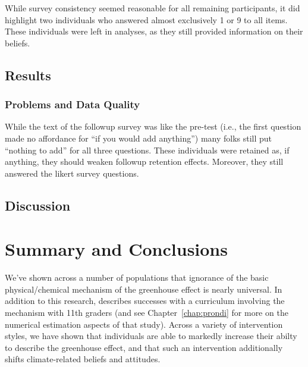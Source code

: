 While survey consistency seemed reasonable for all remaining participants, it
did highlight two individuals who answered almost exclusively 1 or 9 to all
items. These individuals were left in analyses, as they still provided
information on their beliefs. 


\subsection{Results}

\subsubsection{Problems and Data Quality}

While the text of the followup survey was like the pre-test (i.e., the first
question made no affordance for “if you would add anything”) many folks still put
“nothing to add” for all three questions. These individuals were retained as, if
anything, they should weaken followup retention effects. Moreover, they still
answered the likert survey questions. 

\subsection{Discussion}

\section{Summary and Conclusions}

We've shown across a number of populations that ignorance of the basic
physical/chemical mechanism of the greenhouse effect is nearly universal. In
addition to this research, \textcite{felipe_numerical_2012} describes successes
with a curriculum involving the mechanism with 11th graders (and see
Chapter~\ref{chap:prondi} for more on the numerical estimation aspects of that
study). Across a variety of intervention styles, we have shown that individuals
are able to markedly increase their abilty to describe the greenhouse effect,
and that such an intervention additionally shifts climate-related beliefs and
attitudes.

